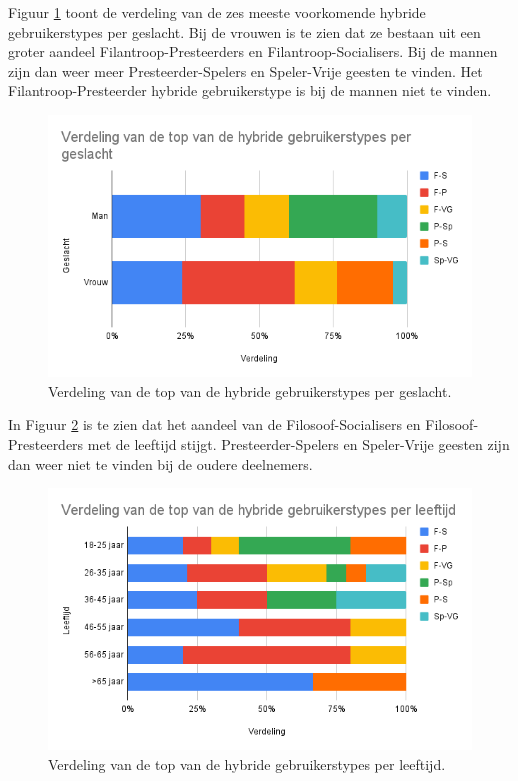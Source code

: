 Figuur \ref{fig:hybridegeslacht} toont de verdeling van de zes meeste voorkomende hybride gebruikerstypes per geslacht. Bij de vrouwen is te zien dat ze bestaan uit een groter aandeel Filantroop-Presteerders en Filantroop-Socialisers. Bij de mannen zijn dan weer meer Presteerder-Spelers en Speler-Vrije geesten te vinden. Het Filantroop-Presteerder hybride gebruikerstype is bij de mannen niet te vinden.

\begin{figure}
    \includegraphics[width=\linewidth]{HybrideGeslacht.png}
    \caption{Verdeling van de top van de hybride gebruikerstypes per geslacht.}
    \label{fig:hybridegeslacht}
\end{figure}

In Figuur \ref{fig:hybrideleeftijd} is te zien dat het aandeel van de Filosoof-Socialisers en Filosoof-Presteerders met de leeftijd stijgt. Presteerder-Spelers en Speler-Vrije geesten zijn dan weer niet te vinden bij de oudere deelnemers.

\begin{figure}
    \includegraphics[width=\linewidth]{HybrideLeeftijd.png}
    \caption{Verdeling van de top van de hybride gebruikerstypes per leeftijd.}
    \label{fig:hybrideleeftijd}
\end{figure}

